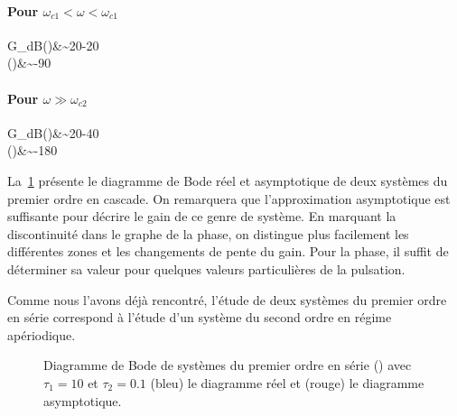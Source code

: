 \paragraph{Pour $\omega_{c1}<\omega<\omega_{c1}$}
\begin{bequation}
    G_{dB}(\omega)&\sim20-20\\
    \phi(\omega)&\sim-90\degreeSI
\end{bequation}
\paragraph{Pour $\omega\gg\omega_{c2}$}
\begin{bequation}
    G_{dB}(\omega)&\sim20-40\\
    \phi(\omega)&\sim-180\degreeSI
\end{bequation}
La~\cref{fig-bode_1er_serie} présente le diagramme de Bode réel et 
asymptotique de deux systèmes du premier ordre en cascade. On remarquera 
que l'approximation asymptotique est suffisante pour décrire le gain de ce 
genre de système. En marquant la discontinuité dans le graphe de la phase, 
on distingue plus facilement les différentes zones et les changements de 
pente du gain. Pour la phase, il suffit de déterminer sa valeur pour 
quelques valeurs particulières de la pulsation. 

Comme nous l'avons déjà rencontré, l'étude de deux systèmes du premier 
ordre en série correspond à l'étude d'un système du second ordre en 
régime apériodique.
\begin{figure}[!t]
    \centering
    

    
    \caption{Diagramme de Bode de systèmes du premier ordre en série 
    () avec $\tau_1=10$ et $\tau_2=0.1$ (bleu) le 
    diagramme réel et (rouge) le diagramme asymptotique.
    \label{fig-bode_1er_serie}}
\end{figure}
